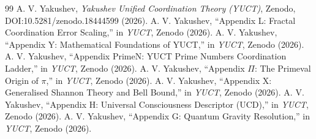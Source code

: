 \documentclass[12pt,a4paper]{article}
\begin{document}
	\begin{thebibliography}{99}
		 A. V. Yakushev, \emph{Yakushev Unified Coordination Theory (YUCT)}, Zenodo, DOI:10.5281/zenodo.18444599 (2026).
		 A. V. Yakushev, ``Appendix L: Fractal Coordination Error Scaling,'' in \emph{YUCT}, Zenodo (2026).
		 A. V. Yakushev, ``Appendix Y: Mathematical Foundations of YUCT,'' in \emph{YUCT}, Zenodo (2026).
		 A. V. Yakushev, ``Appendix PrimeN: YUCT Prime Numbers Coordination Ladder,'' in \emph{YUCT}, Zenodo (2026).
		 A. V. Yakushev, ``Appendix \(\Pi\): The Primeval Origin of \(\pi\),'' in \emph{YUCT}, Zenodo (2026).
		 A. V. Yakushev, ``Appendix X: Generalised Shannon Theory and Bell Bound,'' in \emph{YUCT}, Zenodo (2026).
		 A. V. Yakushev, ``Appendix H: Universal Consciousness Descriptor (UCD),'' in \emph{YUCT}, Zenodo (2026).
		 A. V. Yakushev, ``Appendix G: Quantum Gravity Resolution,'' in \emph{YUCT}, Zenodo (2026).
	\end{thebibliography}
	
\end{document}
